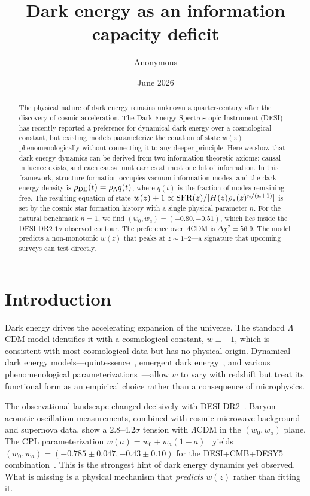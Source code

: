 \documentclass[12pt,a4paper]{article}
\begin{document}
\title{\bf Dark energy as an information capacity deficit}

\author{Anonymous}
\date{June 2026}

\maketitle

\begin{abstract}
The physical nature of dark energy remains unknown a quarter-century after the discovery of cosmic acceleration. The Dark Energy Spectroscopic Instrument (DESI) has recently reported a preference for dynamical dark energy over a cosmological constant, but existing models parameterize the equation of state $w(z)$ phenomenologically without connecting it to any deeper principle. Here we show that dark energy dynamics can be derived from two information-theoretic axioms: causal influence exists, and each causal unit carries at most one bit of information. In this framework, structure formation occupies vacuum information modes, and the dark energy density is $\rho_{\rm DE}(t)=\rho_\Lambda q(t)$, where $q(t)$ is the fraction of modes remaining free. The resulting equation of state $w(z)+1\propto{\rm SFR}(z)/[H(z)\rho_*(z)^{n/(n+1)}]$ is set by the cosmic star formation history with a single physical parameter $n$. For the natural benchmark $n=1$, we find $(w_0,w_a)=(-0.80,-0.51)$, which lies inside the DESI DR2 $1\sigma$ observed contour. The preference over $\Lambda$CDM is $\Delta\chi^2=56.9$. The model predicts a non-monotonic $w(z)$ that peaks at $z\sim1$--$2$---a signature that upcoming surveys can test directly.
\end{abstract}

\section*{Introduction}

Dark energy drives the accelerating expansion of the universe. The standard $\Lambda$CDM model identifies it with a cosmological constant, $w\equiv-1$, which is consistent with most cosmological data but has no physical origin. Dynamical dark energy models---quintessence~\cite{tsujikawa2013}, emergent dark energy~\cite{li2024}, and various phenomenological parameterizations~\cite{chevallier2001,linder2009}---allow $w$ to vary with redshift but treat its functional form as an empirical choice rather than a consequence of microphysics.

The observational landscape changed decisively with DESI DR2~\cite{desi2025}. Baryon acoustic oscillation measurements, combined with cosmic microwave background and supernova data, show a $2.8$--$4.2\sigma$ tension with $\Lambda$CDM in the $(w_0,w_a)$ plane. The CPL parameterization $w(a)=w_0+w_a(1-a)$~\cite{chevallier2001} yields $(w_0,w_a)=(-0.785\pm0.047,-0.43\pm0.10)$ for the DESI+CMB+DESY5 combination~\cite{zhang2026}. This is the strongest hint of dark energy dynamics yet observed. What is missing is a physical mechanism that {\it predicts} $w(z)$ rather than fitting it.
\end{document}
